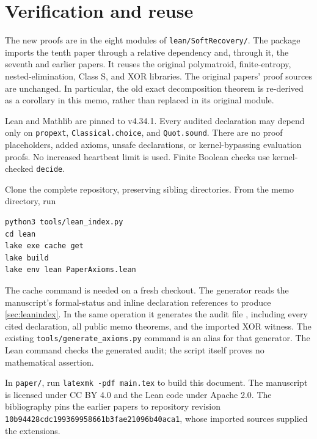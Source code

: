 \section{Verification and reuse}\label{sec:verification}

The new proofs are in the eight modules of \texttt{lean/SoftRecovery/}.
The package imports the tenth paper through a relative dependency and,
through it, the seventh and earlier papers. It reuses the original
polymatroid, finite-entropy, nested-elimination, Class S, and XOR
libraries. The original papers' proof sources are unchanged. In
particular, the old exact decomposition theorem is re-derived as a
corollary in this memo, rather than replaced in its original module.

Lean and Mathlib are pinned to v4.34.1. Every audited declaration may
depend only on \texttt{propext}, \texttt{Classical.choice}, and
\texttt{Quot.sound}. There are no proof placeholders, added axioms,
unsafe declarations, or kernel-bypassing evaluation proofs. No increased
heartbeat limit is used. Finite Boolean checks use kernel-checked
\texttt{decide}.

Clone the complete repository, preserving sibling directories. From
the memo directory, run
\begin{verbatim}
python3 tools/lean_index.py
cd lean
lake exe cache get
lake build
lake env lean PaperAxioms.lean
\end{verbatim}
The cache command is needed on a fresh checkout. The generator reads
the manuscript's formal-status and inline declaration references to
produce \cref{sec:leanindex}. In the same operation it generates the
audit file , including every
cited declaration, all public memo theorems, and the imported XOR
witness. The existing \texttt{tools/generate\_axioms.py} command is an
alias for that generator. The Lean command checks the generated audit;
the script itself proves no mathematical assertion.

In \texttt{paper/}, run \texttt{latexmk -pdf main.tex} to build this
document. The manuscript is licensed under CC BY 4.0 and the Lean code
under Apache 2.0. The bibliography pins the earlier papers to repository
revision \texttt{10b94428cdc199369958661b3fae21096b40aca1}, whose imported
sources supplied the extensions.
